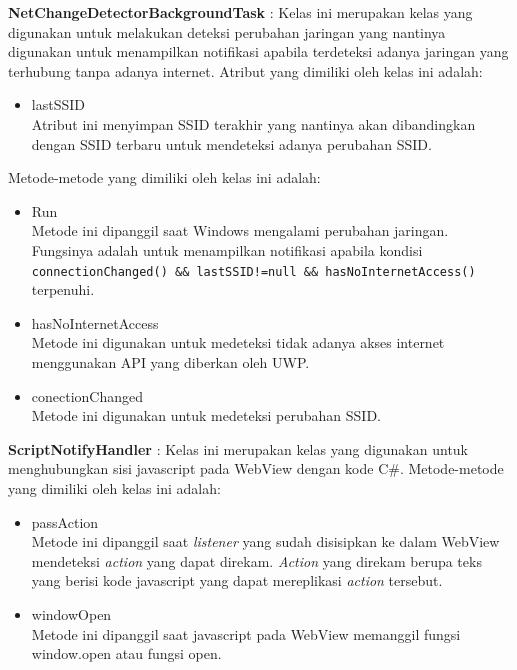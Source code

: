 \par{\textbf{NetChangeDetectorBackgroundTask} : Kelas ini merupakan kelas yang digunakan untuk melakukan deteksi perubahan jaringan yang nantinya digunakan untuk menampilkan notifikasi apabila terdeteksi adanya jaringan yang terhubung tanpa adanya internet. Atribut yang dimiliki oleh kelas ini adalah:
    \begin{itemize}
        \item{lastSSID\\Atribut ini menyimpan SSID terakhir yang nantinya akan dibandingkan dengan SSID terbaru untuk mendeteksi adanya perubahan SSID.}
    \end{itemize}
    Metode-metode yang dimiliki oleh kelas ini adalah:
    \begin{itemize}
        \item{Run\\Metode ini dipanggil saat Windows mengalami perubahan jaringan. Fungsinya adalah untuk menampilkan notifikasi apabila kondisi \texttt{connectionChanged() \&\& lastSSID!=null \&\& hasNoInternetAccess()} terpenuhi.}
        \item{hasNoInternetAccess\\Metode ini digunakan untuk medeteksi tidak adanya akses internet menggunakan API yang diberkan oleh UWP.}
        \item{conectionChanged\\Metode ini digunakan untuk medeteksi perubahan SSID.}
    \end{itemize}
}

\par{\textbf{ScriptNotifyHandler} : Kelas ini merupakan kelas yang digunakan untuk menghubungkan sisi javascript pada WebView dengan kode C\#. Metode-metode yang dimiliki oleh kelas ini adalah:
    \begin{itemize}
        \item{passAction\\Metode ini dipanggil saat \textit{listener} yang sudah disisipkan ke dalam WebView mendeteksi \textit{action} yang dapat direkam. \textit{Action} yang direkam berupa teks yang berisi kode javascript yang dapat mereplikasi \textit{action} tersebut.}
        \item{windowOpen\\Metode ini dipanggil saat javascript pada WebView memanggil fungsi window.open atau fungsi open.}
    \end{itemize}
}

